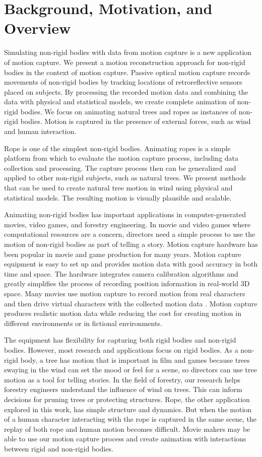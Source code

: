 \chapter{Background, Motivation, and Overview}
Simulating non-rigid bodies with data from motion capture is a new application of motion capture. We present a motion reconstruction approach for non-rigid bodies in the context of motion capture.  Passive optical motion capture records movements of non-rigid bodies by tracking locations of retroreflective sensors placed on subjects. By processing the recorded motion data and combining the data with physical and statistical models, we create complete animation of non-rigid bodies. We focus on animating natural trees and ropes as instances of non-rigid bodies.  Motion is captured in the presence of external forces, such as wind and human interaction. 

Rope is one of the simplest non-rigid bodies. Animating ropes is a simple platform from which to evaluate the motion capture process, including data collection and processing. The capture process then can be generalized and applied to other non-rigid subjects, such as natural trees. We present methods that can be used to create natural tree motion in wind using physical and statistical models. The resulting motion is visually plausible and scalable. 

Animating non-rigid bodies has important applications in computer-generated movies, video games, and forestry engineering. In movie and video games where computational resources are a concern, directors need a simple process to use the motion of non-rigid bodies as part of telling a story. Motion capture hardware has been popular in movie and game production for many years.  Motion capture equipment is easy to set up and provides motion data with good accuracy in both time and space.  The hardware integrates camera calibration algorithms and greatly simplifies the process of recording position information in real-world 3D space. Many movies use motion capture to record motion from real characters and then drive virtual characters with the collected motion data \cite{Jesser2010}. Motion capture produces realistic motion data while reducing the cost for creating motion in different environments or in fictional environments. 

The equipment has flexibility for capturing both rigid bodies and non-rigid bodies. However, most research and applications focus on rigid bodies. As a non-rigid body, a tree has motion that is important in film and games because trees swaying in the wind can set the mood or feel for a scene, so directors can use tree motion as a tool for telling stories. In the field of forestry, our research helps forestry engineers understand the influence of wind on trees. This can inform decisions for pruning trees or protecting structures. Rope, the other application explored in this work, has simple structure and dynamics. But when the motion of a human character interacting with the rope is captured in the same scene, the replay of both rope and human motion becomes difficult. Movie makers may be able to use our motion capture process and create animation with interactions between rigid and non-rigid bodies.

